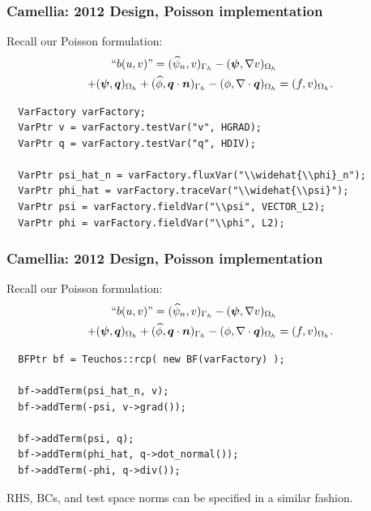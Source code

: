 \documentclass[mathserif]{beamer}
\newcommand{\vect}[1]{\ensuremath\boldsymbol{#1}}
\begin{document}
\begin{frame}[fragile]
\frametitle{Camellia: 2012 Design, Poisson implementation}
Recall our Poisson formulation:
\begin{align*}
\text{``}b(u,v)\text{''} = (\widehat{\psi}_n,v)_{\Gamma_h} - (\vect{\psi}, \nabla v)_{\Omega_h} &\\
+ (\vect{\psi}, \vect{q})_{\Omega_h} + (\widehat{\phi}, \vect{q}  \cdot \vect{n})_{\Gamma_h} - (\phi, \nabla \cdot \vect{q})_{\Omega_h} &= (f,v)_{\Omega_h}.
\end{align*}
\begin{lstlisting}
  VarFactory varFactory; 
  VarPtr v = varFactory.testVar("v", HGRAD);
  VarPtr q = varFactory.testVar("q", HDIV);
    
  VarPtr psi_hat_n = varFactory.fluxVar("\\widehat{\\phi}_n");
  VarPtr phi_hat = varFactory.traceVar("\\widehat{\\psi}");
  VarPtr psi = varFactory.fieldVar("\\psi", VECTOR_L2);
  VarPtr phi = varFactory.fieldVar("\\phi", L2);
\end{lstlisting}

\end{frame}

\begin{frame}[fragile]
\frametitle{Camellia: 2012 Design, Poisson implementation}
Recall our Poisson formulation:
\begin{align*}
\text{``}b(u,v)\text{''} = (\widehat{\psi}_n,v)_{\Gamma_h} - (\vect{\psi}, \nabla v)_{\Omega_h} &\\
+ (\vect{\psi}, \vect{q})_{\Omega_h} + (\widehat{\phi}, \vect{q}  \cdot \vect{n})_{\Gamma_h} - (\phi, \nabla \cdot \vect{q})_{\Omega_h} &= (f,v)_{\Omega_h}.
\end{align*}
\begin{lstlisting}
  BFPtr bf = Teuchos::rcp( new BF(varFactory) );
  
  bf->addTerm(psi_hat_n, v);
  bf->addTerm(-psi, v->grad());
  
  bf->addTerm(psi, q);
  bf->addTerm(phi_hat, q->dot_normal());
  bf->addTerm(-phi, q->div());
\end{lstlisting}

RHS, BCs, and test space norms can be specified in a similar fashion.

\end{frame}
\end{document}
